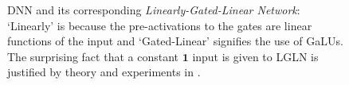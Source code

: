 \begin{comment}
\begin{figure}
\resizebox{.95\columnwidth}{!}{

}
\caption{Illustration of the dual `path-by-path' view of computations.}
\label{fig:paths}
\end{figure}
\end{comment}
\begin{figure}[!t]
\centering
\begin{minipage}{1.0\columnwidth}
\centering
\begin{minipage}{0.49\columnwidth}
\centering

\resizebox{0.8\columnwidth}{!}{

}
\end{minipage}
\begin{minipage}{0.49\columnwidth}
\centering

\resizebox{0.8\columnwidth}{!}{

}
\end{minipage}

\end{minipage}
\caption{\small{DNN and its corresponding \emph{Linearly-Gated-Linear Network}}: `Linearly' is because the pre-activations to the gates are linear functions of the input and `Gated-Linear' signifies the use of GaLUs. The surprising fact that a constant $\mathbf{1}$ input is given to LGLN is justified by theory and experiments in .}
\label{fig:lgln}
\end{figure}


